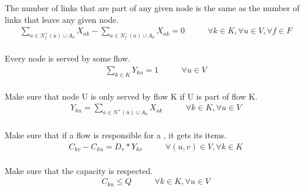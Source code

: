 The number of links that are part of any given node is the same as the number of links that leave any given node. \\

\begin{align*}
    &\sum_{a\in N_f^+(u) \cup A_0}{X_{ak}} - \sum_{a\in N_f^-(u) \cup A_0}{X_{ak}} = 0 & \qquad \forall k \in K, \forall u \in V, \forall f \in F \\
\end{align*}

Every node is served by some flow. \\

\begin{align*}
    &\sum_{k \in K}{Y_{ku}=1} & \qquad \forall u \in V \\
\end{align*}

Make sure that node U is only served by flow K if U is part of flow K. \\

\begin{align*}
   &Y_{ku} = \sum_{a\in N^+(u) \cup A_0}{X_{ak}} & \qquad \forall k \in K, \forall u \in V\\
\end{align*}

Make sure that if a flow is responsible for a , it gets its items. \\

\begin{align*}
    &C_{kv} - C_{ku} = D_v * Y_{kv} & \qquad \forall (u,v) \in V, \forall k \in K\\
\end{align*}

Make sure that the capacity is respected. \\

\begin{align*}
     &C_{ku} \leq Q & \qquad \forall k \in K, \forall u \in V \\
\end{align*}
